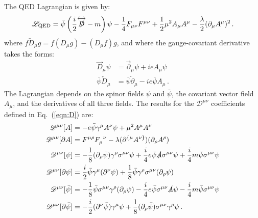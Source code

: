 \documentclass[prd,preprint,
  showpacs,showkeys,lengthcheck,
  nofootinbib,tightenlines,onecolumn,notitlepage,
  preprintnumbers,superscriptaddress]{revtex4-1}
\newcommand{\Lag}{\ensuremath{\mathscr{L}}}
\begin{document}
The QED Lagrangian is given by:
\begin{align}
  \Lag_{\mathrm{QED}}
  =
  \bar\psi
  \left(
  \frac{i}{2}
  \overleftrightarrow{\slashed{D}}
  -
  m
  \right)
  \psi
  -
  \frac{1}{4} F_{\mu\nu} F^{\mu\nu}
  +
  \frac{1}{2} \mu^2 A_\mu A^\mu
  -
  \frac{\lambda}{2} (\partial_\mu A^\mu)^2
  \,.
\end{align}
where
$f \overleftrightarrow{D}_\mu g = f (D_\mu g) - (D_\mu f) g$,
and where the gauge-covariant derivative takes the forms:
\begin{subequations}
  \begin{align}
    \overrightarrow{D}_\mu \psi
    &=
    \overrightarrow{\partial}_\mu \psi
    +
    ie A_\mu \psi
    \\
    \bar\psi \overleftarrow{D}_\mu
    &=
    \bar\psi \overleftarrow{\partial}_\mu
    -
    ie \bar\psi A_\mu
    \,.
  \end{align}
\end{subequations}
The Lagrangian depends on the spinor fields $\psi$ and $\bar\psi$,
the covariant vector field $A_\mu$, and the derivatives of all three fields.
The results for the $\mathscr{D}^{\mu\nu}$ coefficients
defined in Eq.~(\ref{eqn:D}) are:
\begin{subequations}
  \begin{align}
    \mathscr{D}^{\mu\nu}[A]
    &=
    - e\bar\psi \gamma^\mu A^\nu \psi
    +
    \mu^2 A^\mu A^\nu
    \\
    \mathscr{D}^{\mu\nu}[\partial A]
    &=
    F^{\mu\rho}
    F_{\rho}^{\phantom{\rho}\nu}
    -
    \lambda
    (\partial^{\{\mu} A^{\nu\}})
    (\partial_\rho A^\rho)
    \\
    \mathscr{D}^{\mu\nu}[\psi]
    &=
    -
    \frac{1}{8} (\partial_\rho \bar\psi) \gamma^\rho \sigma^{\mu\nu} \psi
    +
    \frac{i}{4} e \bar\psi \slashed{A} \sigma^{\mu\nu} \psi
    +
    \frac{i}{4} m \bar\psi \sigma^{\mu\nu} \psi
    \\
    \mathscr{D}^{\mu\nu}[\partial \psi]
    &=
    \frac{i}{2}
    \bar\psi \gamma^\mu
    (\partial^\nu \psi)
    +
    \frac{1}{8}
    \bar\psi \gamma^\rho
    \sigma^{\mu\nu} (\partial_\rho \psi)
    \\
    \mathscr{D}^{\mu\nu}[\bar\psi]
    &=
    -
    \frac{1}{8} \bar\psi \sigma^{\mu\nu}
    \gamma^\rho (\partial_\rho \psi)
    -
    \frac{i}{4}
    e
    \bar\psi \sigma^{\mu\nu} \slashed{A} \psi
    -
    \frac{i}{4}
    m
    \bar\psi \sigma^{\mu\nu} \psi
    \\
    \mathscr{D}^{\mu\nu}[\partial \bar\psi]
    &=
    - \frac{i}{2} (\partial^\nu\bar\psi) \gamma^\mu \psi
    + \frac{1}{8} (\partial_\rho \bar\psi) \sigma^{\mu\nu}
    \gamma^\rho \psi
    \,.
  \end{align}
\end{subequations}
\end{document}
